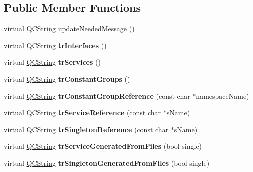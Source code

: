 \subsection*{Public Member Functions}
\begin{DoxyCompactItemize}
\item 
virtual \mbox{\hyperlink{class_q_c_string}{Q\+C\+String}} \mbox{\hyperlink{class_translator_adapter__1__8__4_a87dbcf9a99bf2ddfd9593461d331b714}{update\+Needed\+Message}} ()
\item 
\mbox{\label{class_translator_adapter__1__8__4_a9bed6b9e7675c823022339b518421a66}} 
virtual \mbox{\hyperlink{class_q_c_string}{Q\+C\+String}} {\bfseries tr\+Interfaces} ()
\item 
\mbox{\label{class_translator_adapter__1__8__4_a8fb11db78b8f48b000a8f59f2d371b88}} 
virtual \mbox{\hyperlink{class_q_c_string}{Q\+C\+String}} {\bfseries tr\+Services} ()
\item 
\mbox{\label{class_translator_adapter__1__8__4_aa07851abe1843c4c8530164a62924c18}} 
virtual \mbox{\hyperlink{class_q_c_string}{Q\+C\+String}} {\bfseries tr\+Constant\+Groups} ()
\item 
\mbox{\label{class_translator_adapter__1__8__4_a29436fe42b5d4019bccd69ea0f76df11}} 
virtual \mbox{\hyperlink{class_q_c_string}{Q\+C\+String}} {\bfseries tr\+Constant\+Group\+Reference} (const char $\ast$namespace\+Name)
\item 
\mbox{\label{class_translator_adapter__1__8__4_a7c2596ce1d0872da3e22cb33ec32a57c}} 
virtual \mbox{\hyperlink{class_q_c_string}{Q\+C\+String}} {\bfseries tr\+Service\+Reference} (const char $\ast$s\+Name)
\item 
\mbox{\label{class_translator_adapter__1__8__4_a916e58d54ae15e3d99b134e1d45e2db3}} 
virtual \mbox{\hyperlink{class_q_c_string}{Q\+C\+String}} {\bfseries tr\+Singleton\+Reference} (const char $\ast$s\+Name)
\item 
\mbox{\label{class_translator_adapter__1__8__4_a5b2a344738143665e24d41da7a32a4d8}} 
virtual \mbox{\hyperlink{class_q_c_string}{Q\+C\+String}} {\bfseries tr\+Service\+Generated\+From\+Files} (bool single)
\item 
\mbox{\label{class_translator_adapter__1__8__4_a97a9aea944d6ef3b39c40bd01a62fdbc}} 
virtual \mbox{\hyperlink{class_q_c_string}{Q\+C\+String}} {\bfseries tr\+Singleton\+Generated\+From\+Files} (bool single)
\end{DoxyCompactItemize}
